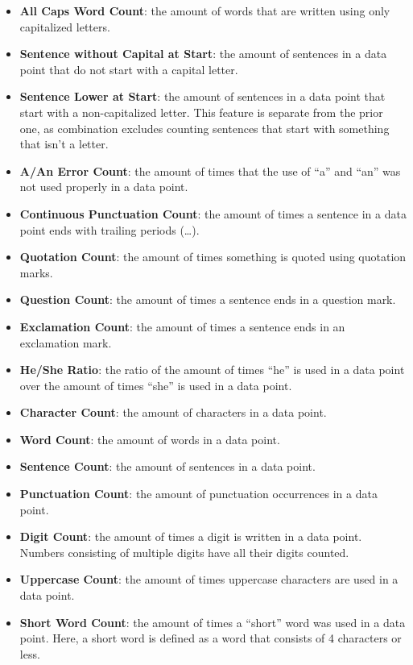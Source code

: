 \documentclass{article}
\begin{document}
\begin{itemize}
  \item \textbf{All Caps Word Count}: the amount of words that are written using only capitalized letters.
  \item \textbf{Sentence without Capital at Start}: the amount of sentences in a data point that do not start with a capital letter.
  \item \textbf{Sentence Lower at Start}: the amount of sentences in a data point that start with a non-capitalized letter. This feature is separate from the prior one, as combination excludes counting sentences that start with something that isn't a letter.
  \item \textbf{A/An Error Count}: the amount of times that the use of ``a'' and ``an'' was not used properly in a data point.
  \item \textbf{Continuous Punctuation Count}: the amount of times a sentence in a data point ends with trailing periods (\dots).
  \item \textbf{Quotation Count}: the amount of times something is quoted using quotation marks.
  \item \textbf{Question Count}: the amount of times a sentence ends in a question mark.
  \item \textbf{Exclamation Count}: the amount of times a sentence ends in an exclamation mark.
  \item \textbf{He/She Ratio}: the ratio of the amount of times ``he'' is used in a data point over the amount of times ``she'' is used in a data point.
  \item \textbf{Character Count}: the amount of characters in a data point.
  \item \textbf{Word Count}: the amount of words in a data point.
  \item \textbf{Sentence Count}: the amount of sentences in a data point.
  \item \textbf{Punctuation Count}: the amount of punctuation occurrences in a data point.
  \item \textbf{Digit Count}: the amount of times a digit is written in a data point. Numbers consisting of multiple digits have all their digits counted.
  \item \textbf{Uppercase Count}: the amount of times uppercase characters are used in a data point.
  \item \textbf{Short Word Count}: the amount of times a ``short'' word was used in a data point. Here, a short word is defined as a word that consists of 4 characters or less.

\end{itemize}
\end{document}
